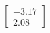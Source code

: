 \documentclass[preview]{standalone}
\begin{document}
\begin{align*}
\begin{bmatrix} -3.17 \\ 2.08 \end{bmatrix}
\end{align*}
\end{document}

